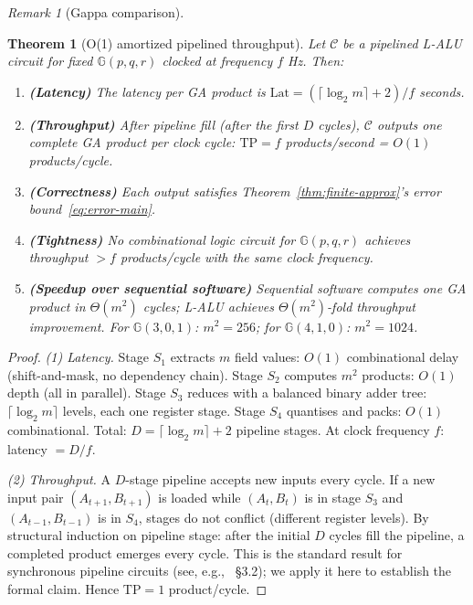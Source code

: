 \documentclass[11pt,a4paper]{article}
\theoremstyle{definition}
\theoremstyle{plain}
\newtheorem{theorem}{Theorem}[section]
\theoremstyle{remark}
\newtheorem{remark}{Remark}[section]
\newcommand{\GA}{\mathbb{G}}
\newcommand{\ceil}[1]{\lceil #1 \rceil}
\newcommand{\Throughput}{\mathrm{TP}}
\newcommand{\Latency}{\mathrm{Lat}}
\begin{document}
\begin{remark}[Gappa comparison]
\begin{theorem}[O(1) amortized pipelined throughput]\label{thm:throughput}
Let $\mathcal{C}$ be a pipelined L-ALU circuit for fixed $\GA(p,q,r)$
clocked at frequency $f$ Hz.
Then:
\begin{enumerate}
  \item \textbf{(Latency)} The latency per GA product is
        $\Latency = (\ceil{\log_2 m}+2)/f$ seconds.
  \item \textbf{(Throughput)} After pipeline fill (after the first
        $D$ cycles), $\mathcal{C}$ outputs \emph{one complete GA product
        per clock cycle}:
        $\Throughput = f$ products/second = $O(1)$ products/cycle.
  \item \textbf{(Correctness)} Each output satisfies
        Theorem~\ref{thm:finite-approx}'s error bound~\eqref{eq:error-main}.
  \item \textbf{(Tightness)} No combinational logic circuit for
        $\GA(p,q,r)$ achieves throughput $>f$ products/cycle with
        the same clock frequency.
  \item \textbf{(Speedup over sequential software)}
        Sequential software computes one GA product in $\Theta(m^2)$
        cycles; L-ALU achieves $\Theta(m^2)$-fold throughput improvement.
        For $\GA(3,0,1)$: $m^2 = 256$; for $\GA(4,1,0)$: $m^2=1024$.
\end{enumerate}
\end{theorem}

\begin{proof}
\textit{(1) Latency.}
Stage $S_1$ extracts $m$ field values: $O(1)$ combinational delay
(shift-and-mask, no dependency chain).
Stage $S_2$ computes $m^2$ products: $O(1)$ depth (all in parallel).
Stage $S_3$ reduces with a balanced binary adder tree:
$\ceil{\log_2 m}$ levels, each one register stage.
Stage $S_4$ quantises and packs: $O(1)$ combinational.
Total: $D = \ceil{\log_2 m} + 2$ pipeline stages.
At clock frequency $f$: latency $= D/f$.

\textit{(2) Throughput.}
A $D$-stage pipeline accepts new inputs every cycle.
If a new input pair $(A_{t+1}, B_{t+1})$ is loaded while
$(A_t, B_t)$ is in stage $S_3$ and $(A_{t-1}, B_{t-1})$ is in $S_4$,
stages do not conflict (different register levels).
By structural induction on pipeline stage: after the initial $D$
cycles fill the pipeline, a completed product emerges every cycle.
This is the standard result for synchronous pipeline circuits
(see, e.g.,~\cite{proakis2007} \S3.2); we apply it here to establish
the formal claim.
Hence $\Throughput = 1$ product/cycle.


\end{proof}
\end{remark}
\end{document}
